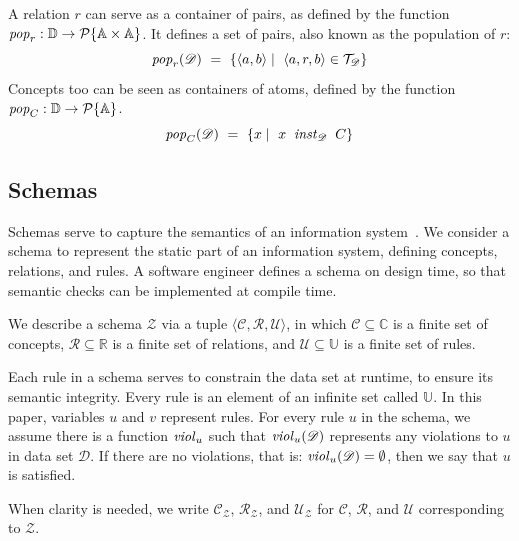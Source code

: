 \documentclass[runningheads]{llncs}
\newcommand{\id}[1]{\text{\it #1\/}}
\newcommand{\pop}[2]{\id{pop}_{#1}(#2)}
\newcommand{\instance}{\mathbin{\id{inst}}}
\newcommand{\viol}[2]{\violC{#1}(#2)}
\newcommand{\violC}[1]{\id{viol}_{#1}}
\newcommand{\powerset}[1]{\cal{P}\{#1\}}
\newcommand{\declare}[3]{\id{#1}_{\pair{#2}{#3}}}
\newcommand{\pair}[2]{\langle{#1},{#2}\rangle}
\newcommand{\Pair}[2]{#1\times#2}
\newcommand{\triple}[3]{\langle{#1},{#2},{#3}\rangle}
\newcommand{\Atoms}{\mathbb{A}}
\newcommand{\concepts}{\mathcal{C}}
\newcommand{\Concepts}{\mathbb{C}}
\newcommand{\rels}{\mathcal{R}}   %
\newcommand{\Rels}{\mathbb{R}}   %
\newcommand{\triples}{\mathcal{T}}
\newcommand{\rules}{\mathcal{U}}
\newcommand{\Rules}{\mathbb{U}}
\newcommand{\dataset}{\mathscr{D}}
\newcommand{\Dataset}{\mathbb{D}}
\newcommand{\schema}{\mathscr{Z}}
\newcommand{\infsys}{\mathscr{S}}
\begin{document}
   A relation $r$ can serve as a container of pairs,
   as defined by the function $\id{pop}_r:\Dataset\rightarrow\powerset{\Pair{\Atoms}{\Atoms}}$.
   It defines a set of pairs, also known as the population of $r$:
\begin{equation}
   \pop{r}{\dataset}\ =\ \{ \pair{a}{b}\mid\ \triple{a}{r}{b}\in\triples_{\dataset}\}
\label{eqn:pop-rel}
\end{equation}
%
   Concepts too can be seen as containers of atoms,
   defined by the function $\id{pop}_C:\Dataset\rightarrow\powerset{\Atoms}$.
\begin{equation}
   \pop{C}{\dataset}\ =\ \{ x\mid\ x\ \instance_{\dataset}\ C\}
\label{eqn:pop-concept}
\end{equation}

\subsection{Schemas}
\label{sct:Schemas}
   Schemas serve to capture the semantics of an information system~\cite{Spivak2012}.
   We consider a schema to represent the static part of an information system, defining concepts, relations, and rules.
   A software engineer defines a schema on design time, so that semantic checks can be implemented at compile time.

   We describe a schema $\schema$ via a tuple $\triple{\concepts}{\rels}{\rules}$,
   in which $\concepts\subseteq \Concepts$ is a finite set of concepts,
   $\rels\subseteq \Rels$ is a finite set of relations,
   and $\rules\subseteq \Rules$ is a finite set of rules.
   
   Each rule in a schema serves to constrain the data set at runtime, to ensure its semantic integrity.
   Every rule is an element of an infinite set called $\Rules$.
   In this paper, variables $u$ and $v$ represent rules.
   For every rule $u$ in the schema, we assume there is a function $\violC{u}$ such that $\viol{u}{\dataset}$ represents any violations to $u$ in data set $\dataset$.
   If there are no violations, that is: $\viol{u}{\dataset} = \emptyset{}$, then we say that $u$ is satisfied.
   
   When clarity is needed, we write $\concepts_{\schema}$, $\rels_{\schema}$, and $\rules_{\schema}$
   for $\concepts$, $\rels$, and $\rules$ corresponding to $\schema$.
\end{document}
